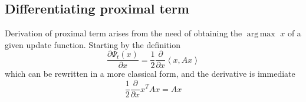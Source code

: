 \documentclass[notitlepage]{article}
\DeclareMathOperator*{\argmax}{arg\,max}
\begin{document}
\subsection{Differentiating proximal term}
Derivation of proximal term arises from the need of obtaining the $\argmax$ $x$ of a given update function. Starting by the definition
\[
  \frac{\partial \Psi_t(x)}{\partial x} = \frac{1}{2} \frac{\partial}{\partial x} \left\langle x, A x \right\rangle  
\]
which can be rewritten in a more classical form, and the derivative is immediate
\[
  \frac{1}{2} \frac{\partial}{\partial x} x^T A x = A x
\]
\end{document}
